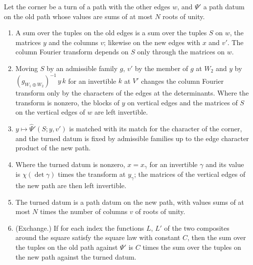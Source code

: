 \begin{lemma}\label{lem:turn-datum}
Let the corner be a turn of a path with the other edges $w$, and $\Psi'$ a path datum on the old path whose values are sums of at most $N$ roots of unity.
\begin{enumerate}[label=\textup{(\alph*)}]
\item A sum over the tuples on the old edges is a sum over the tuples $S$ on $w$, the matrices $y$ and the columns $v$; likewise on the new edges with $x$ and $v'$. The column Fourier transform depends on $S$ only through the
matrices on $w$.
\item Moving $S$ by an admissible family $g$, $v'$ by the member of $g$ at $W_2$ and $y$ by $(g_{W_1\oplus W_2})^{-1}\,y\,k$ for an invertible $k$ at $V'$ changes the column Fourier transform only by the characters of the edges at the
determinants. Where the transform is nonzero, the blocks of $y$ on vertical edges and the matrices of $S$ on the vertical edges of $w$ are left invertible.
\item $y\mapsto\hat\Psi'(S;y,v')$ is matched with its match for the character of the corner, and the turned datum is fixed by admissible families up to the edge character product of the new path.
\item Where the turned datum is nonzero, $x=x_\gamma$ for an invertible $\gamma$ and its value is $\chi(\det\gamma)$ times the transform at $y_\gamma$; the matrices of the vertical edges of the new path are then left invertible.
\item The turned datum is a path datum on the new path, with values sums of at most $N$ times the number of columns $v$ of roots of unity.
\item (Exchange.) If for each index the functions $L$, $L'$ of the two composites around the square satisfy the square law with constant $C$, then the sum over the tuples on the old path against $\Psi'$ is $C$ times the sum over the
tuples on the new path against the turned datum.
\end{enumerate}
\end{lemma}

